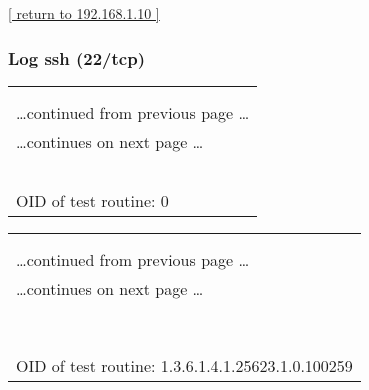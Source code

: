 \documentclass{article}
\begin{document}
\begin{footnotesize}\hyperref[host:192.168.1.10]{[ return to 192.168.1.10 ]}\end{footnotesize}
\subsubsection{Log ssh (22/tcp)}
\label{port:192.168.1.10 ssh (22/tcp) Log}

\begin{longtable}{|p{}|}
\hline
\rowcolor{openvas_log}{\color{white}{Log}}\\
\rowcolor{openvas_log}{\color{white}{NVT: }}\\
\hline
\endfirsthead
\hfill\ldots continued from previous page \ldots \\
\hline
\endhead
\hline
\ldots continues on next page \ldots \\
\endfoot
\hline
\endlastfoot
\\
\rowcolor{white}{\verb=Open port.=}\\
\rowcolor{white}{\verb==}\\
\rowcolor{white}{\verb==}\\
\\
OID of test routine: 0\\
\end{longtable}

\begin{longtable}{|p{}|}
\hline
\rowcolor{openvas_log}{\color{white}{Log (CVSS: 0.0) }}\\
\rowcolor{openvas_log}{\color{white}{NVT: SSH Protocol Versions Supported}}\\
\hline
\endfirsthead
\hfill\ldots continued from previous page \ldots \\
\hline
\endhead
\hline
\ldots continues on next page \ldots \\
\endfoot
\hline
\endlastfoot
\\
\rowcolor{white}{\verb=The remote SSH Server supports the following SSH Protocol Versions:=}\\
\rowcolor{white}{\verb=1.99=}\\
\rowcolor{white}{\verb=2.0=}\\
\rowcolor{white}{\verb=SSHv2 Fingerprint: 0c:d8:26:b3:dd:f0:d4:83:57:95:78:f8:5a:0c:ae:53=}\\
\rowcolor{white}{\verb==}\\
\rowcolor{white}{\verb==}\\
\\
OID of test routine: 1.3.6.1.4.1.25623.1.0.100259\\
\end{longtable}
\end{document}
